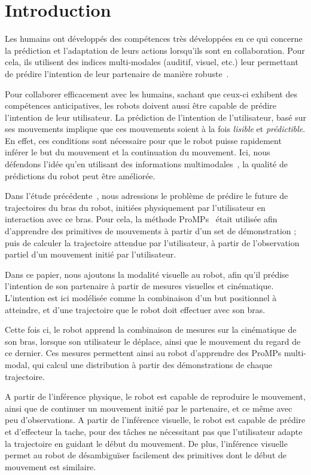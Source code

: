 \documentclass[runningheads,a4paper]{llncs}
\begin{document}
\section{Introduction}

Les humains ont développés des compétences très développées en ce qui concerne la prédiction et l'adaptation de leurs actions lorsqu'ils sont en collaboration. Pour cela, ils utilisent des indices multi-modales (auditif, visuel, etc.) leur permettant de prédire l'intention de leur partenaire de manière robuste~\cite{walker1997infants}.


Pour collaborer efficacement avec les humains, sachant que ceux-ci exhibent des compétences anticipatives, les robots doivent aussi être capable de prédire l'intention de leur utilisateur. La prédiction de l'intention de l'utilisateur, basé sur ses mouvements implique que ces mouvements soient à la fois \textit{lisible} et \textit{prédictible}. En effet, ces conditions sont nécessaire pour que le robot puisse rapidement inférer le but du mouvement et la continuation du mouvement. 
Ici, nous défendons l'idée qu'en utilisant des informations multimodales~\cite{dillmann2004armar,weser2006multimodal}, la qualité de prédictions du robot peut être améliorée.


Dans l'étude précédente~\cite{oriane2017}, nous adressions le problème de prédire le future de trajectoires du bras du robot, initiées physiquement par l'utilisateur en interaction avec ce bras. Pour cela, la méthode ProMPs~\cite{paraschos2013probabilistic} était utilisée afin d'apprendre des primitives de mouvements à partir d'un set de démonstration ; puis de calculer la trajectoire attendue par l'utilisateur, à partir de l'observation partiel d'un mouvement initié par l'utilisateur.

Dans ce papier, nous ajoutons la modalité visuelle au robot, afin qu'il prédise l'intention de son partenaire à partir de mesures visuelles et cinématique. L'intention est ici modélisée comme la combinaison d'un but positionnel à atteindre, et d'une trajectoire que le robot doit effectuer avec son bras.

Cette fois ci, le robot apprend la combinaison de mesures sur la cinématique de son bras, lorsque son utilisateur le déplace, ainsi que le mouvement du regard de ce dernier. Ces mesures permettent ainsi au robot d'apprendre des ProMPs multi-modal, qui calcul une distribution à partir des démonstrations de chaque trajectoire.

A partir de l'inférence physique, le robot est capable de reproduire le mouvement, ainsi que de continuer un mouvement initié par le partenaire, et ce même avec peu d'observations. A partir de l’inférence visuelle, le robot est capable de prédire et d'effecteur la tache, pour des tâches ne nécessitant pas que l'utilisateur adapte la trajectoire en guidant le début du mouvement. De plus, l'inférence visuelle permet au robot de désambiguïser facilement des primitives dont le début de mouvement est similaire.
 
\end{document}

